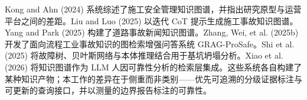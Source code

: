 \documentclass[11pt]{article}
\begin{document}
Kong and Ahn (2024) {\cjkfont 系\allowbreak 统\allowbreak 综\allowbreak 述\allowbreak 了\allowbreak 施\allowbreak 工\allowbreak 安\allowbreak 全\allowbreak 管\allowbreak 理\allowbreak 知\allowbreak 识\allowbreak 图\allowbreak 谱\allowbreak ，\allowbreak 并\allowbreak 指\allowbreak 出\allowbreak 研\allowbreak 究\allowbreak 原\allowbreak 型\allowbreak 与\allowbreak 运\allowbreak 营\allowbreak 平\allowbreak 台\allowbreak 之\allowbreak 间\allowbreak 的\allowbreak 差\allowbreak 距\allowbreak 。}Liu and Luo (2025) {\cjkfont 以\allowbreak 迭\allowbreak 代} CoT {\cjkfont 提\allowbreak 示\allowbreak 生\allowbreak 成\allowbreak 施\allowbreak 工\allowbreak 事\allowbreak 故\allowbreak 知\allowbreak 识\allowbreak 图\allowbreak 谱\allowbreak 。}Yang and Park (2025) {\cjkfont 构\allowbreak 建\allowbreak 了\allowbreak 道\allowbreak 路\allowbreak 事\allowbreak 故\allowbreak 新\allowbreak 闻\allowbreak 知\allowbreak 识\allowbreak 图\allowbreak 谱\allowbreak 。}Zhang, Wei, et al. (2025b) {\cjkfont 开\allowbreak 发\allowbreak 了\allowbreak 面\allowbreak 向\allowbreak 流\allowbreak 程\allowbreak 工\allowbreak 业\allowbreak 事\allowbreak 故\allowbreak 知\allowbreak 识\allowbreak 的\allowbreak 图\allowbreak 检\allowbreak 索\allowbreak 增\allowbreak 强\allowbreak 问\allowbreak 答\allowbreak 系\allowbreak 统} GRAG-ProSafe{\cjkfont 。}Shi et al. (2025) {\cjkfont 将\allowbreak 故\allowbreak 障\allowbreak 树\allowbreak 、\allowbreak 贝\allowbreak 叶\allowbreak 斯\allowbreak 网\allowbreak 络\allowbreak 与\allowbreak 本\allowbreak 体\allowbreak 推\allowbreak 理\allowbreak 结\allowbreak 合\allowbreak 用\allowbreak 于\allowbreak 基\allowbreak 坑\allowbreak 坍\allowbreak 塌\allowbreak 分\allowbreak 析\allowbreak 。}Xiao et al. (2026) {\cjkfont 将\allowbreak 知\allowbreak 识\allowbreak 图\allowbreak 谱\allowbreak 作\allowbreak 为} LLM {\cjkfont 人\allowbreak 因\allowbreak 可\allowbreak 靠\allowbreak 性\allowbreak 分\allowbreak 析\allowbreak 的\allowbreak 检\allowbreak 索\allowbreak 层\allowbreak 集\allowbreak 成\allowbreak 。\allowbreak 这\allowbreak 些\allowbreak 系\allowbreak 统\allowbreak 各\allowbreak 自\allowbreak 构\allowbreak 建\allowbreak 了\allowbreak 某\allowbreak 种\allowbreak 知\allowbreak 识\allowbreak 产\allowbreak 物\allowbreak ；\allowbreak 本\allowbreak 工\allowbreak 作\allowbreak 的\allowbreak 差\allowbreak 异\allowbreak 在\allowbreak 于\allowbreak 侧\allowbreak 重\allowbreak 而\allowbreak 非\allowbreak 类\allowbreak 别}------{\cjkfont 优\allowbreak 先\allowbreak 可\allowbreak 追\allowbreak 溯\allowbreak 的\allowbreak 分\allowbreak 级\allowbreak 证\allowbreak 据\allowbreak 标\allowbreak 注\allowbreak 与\allowbreak 可\allowbreak 更\allowbreak 新\allowbreak 的\allowbreak 查\allowbreak 询\allowbreak 接\allowbreak 口\allowbreak ，\allowbreak 并\allowbreak 以\allowbreak 测\allowbreak 量\allowbreak 的\allowbreak 边\allowbreak 界\allowbreak 报\allowbreak 告\allowbreak 标\allowbreak 注\allowbreak 的\allowbreak 可\allowbreak 靠\allowbreak 性\allowbreak 。}
\end{document}
